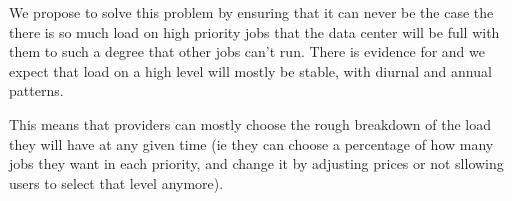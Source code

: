 We propose to solve this problem by ensuring that it can never be the case the
there is so much load on high priority jobs that the data center will be full
with them to such a degree that other jobs can't run. There is evidence for and
we expect that load on a high level will mostly be stable, with diurnal and
annual patterns.\cite{TODO}

This means that providers can mostly choose the rough breakdown of the load they
will have at any given time (ie they can choose a percentage of how many jobs
they want in each priority, and change it by adjusting prices or not sllowing
users to select that level anymore). 



